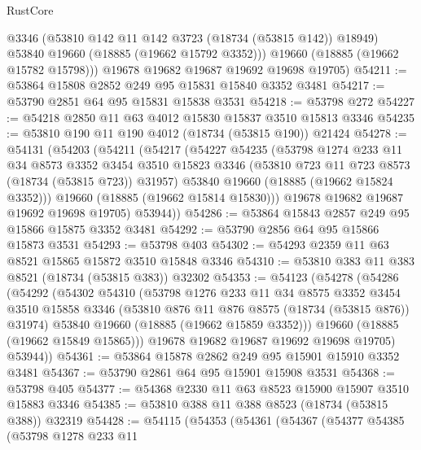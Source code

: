 \begin{lexlean}{RustCore}
\begin{coremodule}
          @3346
          (@53810 @142 @11 @142 @3723 (@18734 (@53815 @142)) @18949)
          @53840
          @19660
          (@18885 (@19662 @15792 @3352)))
        @19660
        (@18885 (@19662 @15782 @15798)))
      @19678
      @19682
      @19687
      @19692
      @19698
      @19705)
@54211 := @53864 @15808 @2852 @249 @95 @15831 @15840 @3352 @3481
@54217 := @53790 @2851 @64 @95 @15831 @15838 @3531
@54218 := @53798 @272
@54227 := @54218 @2850 @11 @63 @4012 @15830 @15837 @3510 @15813 @3346
@54235 := @53810 @190 @11 @190 @4012 (@18734 (@53815 @190)) @21424
@54278 := @54131
    (@54203
      (@54211
        (@54217
          (@54227
            @54235
            (@53798
              @1274
              @233
              @11
              @34
              @8573
              @3352
              @3454
              @3510
              @15823
              @3346
              (@53810 @723 @11 @723 @8573 (@18734 (@53815 @723)) @31957)
              @53840
              @19660
              (@18885 (@19662 @15824 @3352)))
            @19660
            (@18885 (@19662 @15814 @15830)))
          @19678
          @19682
          @19687
          @19692
          @19698
          @19705)
        @53944))
@54286 := @53864 @15843 @2857 @249 @95 @15866 @15875 @3352 @3481
@54292 := @53790 @2856 @64 @95 @15866 @15873 @3531
@54293 := @53798 @403
@54302 := @54293 @2359 @11 @63 @8521 @15865 @15872 @3510 @15848 @3346
@54310 := @53810 @383 @11 @383 @8521 (@18734 (@53815 @383)) @32302
@54353 := @54123
    (@54278
      (@54286
        (@54292
          (@54302
            @54310
            (@53798
              @1276
              @233
              @11
              @34
              @8575
              @3352
              @3454
              @3510
              @15858
              @3346
              (@53810 @876 @11 @876 @8575 (@18734 (@53815 @876)) @31974)
              @53840
              @19660
              (@18885 (@19662 @15859 @3352)))
            @19660
            (@18885 (@19662 @15849 @15865)))
          @19678
          @19682
          @19687
          @19692
          @19698
          @19705)
        @53944))
@54361 := @53864 @15878 @2862 @249 @95 @15901 @15910 @3352 @3481
@54367 := @53790 @2861 @64 @95 @15901 @15908 @3531
@54368 := @53798 @405
@54377 := @54368 @2330 @11 @63 @8523 @15900 @15907 @3510 @15883 @3346
@54385 := @53810 @388 @11 @388 @8523 (@18734 (@53815 @388)) @32319
@54428 := @54115
    (@54353
      (@54361
        (@54367
          (@54377
            @54385
            (@53798
              @1278
              @233
              @11

\end{coremodule}
\end{lexlean}
